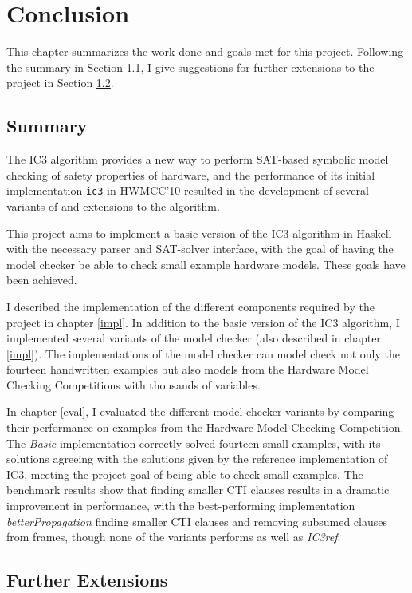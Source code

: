 \documentclass[12pt,a4paper,twoside,openright]{report}
\begin{document}
{\chapter{Conclusion}
\label{conc}

This chapter summarizes the work done and goals met for this project.
Following the summary in Section \ref{conc:summary}, I give
suggestions for further extensions to the project in Section \ref{conc:extensions}.

\section{Summary}
\label{conc:summary}

The IC3 algorithm provides a new way to perform SAT-based symbolic model checking of
safety properties of hardware, and the performance of its initial implementation
\verb,ic3, in HWMCC'10 resulted in the development of several variants of
and extensions to the algorithm.

This project aims to implement a basic version of the IC3 algorithm in Haskell with the
necessary parser and SAT-solver interface, with the goal of having the model checker
be able to check small example hardware models. These goals have been achieved.

I described the implementation of the different components required by
the project in chapter \ref{impl}.
In addition to the basic version of the IC3 algorithm, I implemented several variants of the model checker (also described in chapter \ref{impl}).
The implementations of the model checker can model check not only
the fourteen handwritten examples but also models from the
Hardware Model Checking Competitions with thousands of variables.

In chapter \ref{eval}, I evaluated the different model checker variants by comparing their performance on examples from
the Hardware Model Checking Competition.
The \emph{Basic} implementation correctly
solved fourteen small examples, with its solutions agreeing with the solutions given by
the reference implementation of IC3, meeting the project goal of being able to check
small examples.
The benchmark results show that finding smaller CTI clauses
results in a dramatic improvement in performance, with the best-performing implementation
\emph{betterPropagation} finding smaller CTI clauses and removing subsumed clauses from frames,
though none of the variants performs as well as \emph{IC3ref}.

\section{Further Extensions}
\label{conc:extensions}

}
\end{document}
